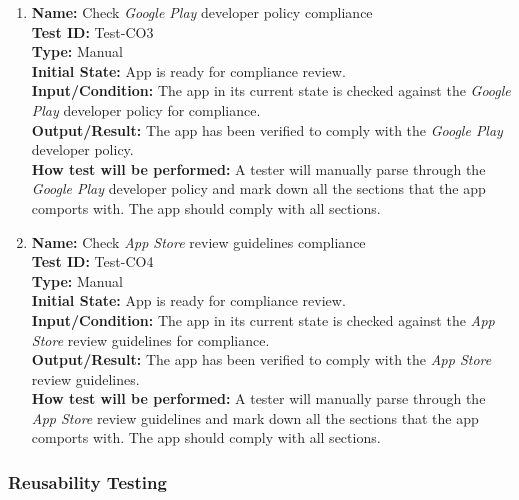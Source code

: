 \documentclass[12pt, titlepage]{article}
\begin{document}
\begin{enumerate}
\begin{enumerate}
    \item
    \textbf{Name:} Check \textit{Google Play} developer policy \cite{GooglePlay} compliance \label{itm:Test-CO3} \\
    \textbf{Test ID:} Test-CO3 \\
    \textbf{Type:} Manual \\
    \textbf{Initial State:} App is ready for compliance review. \\
    \textbf{Input/Condition:} The app in its current state is checked against the \textit{Google Play} developer policy for compliance. \\
    \textbf{Output/Result:} The app has been verified to comply with the \textit{Google Play} developer policy. \\
    \textbf{How test will be performed:} A tester will manually parse through the \textit{Google Play} developer policy and mark down all the sections that the app comports with. The app should comply with all sections.

    \item
    \textbf{Name:} Check \textit{App Store} review guidelines \cite{AppStore} compliance \label{itm:Test-CO4} \\
    \textbf{Test ID:} Test-CO4 \\
    \textbf{Type:} Manual \\
    \textbf{Initial State:} App is ready for compliance review. \\
    \textbf{Input/Condition:} The app in its current state is checked against the \textit{App Store} review guidelines for compliance. \\
    \textbf{Output/Result:} The app has been verified to comply with the \textit{App Store} review guidelines. \\
    \textbf{How test will be performed:} A tester will manually parse through the \textit{App Store} review guidelines and mark down all the sections that the app comports with. The app should comply with all sections.

\end{enumerate}

\subsubsection{Reusability Testing}

\begin{enumerate}


\end{enumerate}
\end{enumerate}
\end{document}

